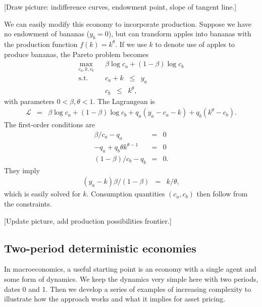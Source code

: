 \documentclass[11pt]{article}
\begin{document}
[Draw picture:  indifference curves, endowment point,
slope of tangent line.]

We can easily modify this economy to incorporate production.
Suppose we have no endowment of bananas ($y_b=0$),
but can transform apples into bananas with the
production function $f(k) = k^\theta$.
If we use $k$ to denote use of apples to produce bananas,
the Pareto problem becomes
\begin{eqnarray*}
    \max_{c_a,k,c_b} &&  \beta \log c_a + (1-\beta) \log c_b \\
    \mbox{s.t.}   &&  c_a + k \;\;\leq\;\; y_a \\
                  &&  c_b \;\;\leq\;\; k^\theta ,
\end{eqnarray*}
with parameters $ 0 < \beta,\theta < 1$.
The Lagrangean is
\begin{eqnarray*}
    \mathcal{L} &=&  \beta \log c_a + (1-\beta) \log c_b
                + q_a (y_a - c_a - k) + q_b (k^\theta - c_b ) .
\end{eqnarray*}
The first-order conditions are
\begin{eqnarray*}
    \beta/c_a - q_a &=& 0 \\
    - q_a + q_b \theta k^{\theta-1} &=& 0 \\
   (1-\beta)/c_b - q_b &=& 0 .
\end{eqnarray*}
They imply
\begin{eqnarray*}
    (y_a - k) \beta /(1-\beta) &=& k / \theta ,
\end{eqnarray*}
which is easily solved for $k$.
Consumption quantities $(c_a,c_b)$ then follow from the
constraints.

[Update picture, add production possibilities frontier.]



\subsection*{Two-period deterministic economies}

In macroeconomics, a useful starting point is an
economy with a single agent and some form of dynamics.
We keep the dynamics very simple here with two periods,
dates 0 and 1.
Then we develop a series of examples of increasing complexity
to illustrate how the approach works and what it implies for asset pricing.
\end{document}
